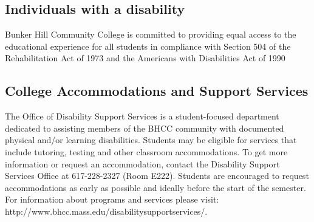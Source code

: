 \documentclass[12pt,letterpaper]{article}
\begin{document}
\subsection*{Individuals with a disability}
Bunker Hill Community College is committed to providing equal access to the educational experience for all students in compliance with Section 504 of the Rehabilitation Act of 1973 and the Americans with Disabilities Act of 1990

\subsection*{College Accommodations and Support Services }
The Office of Disability Support Services is a student-focused department dedicated to assisting members of the BHCC community with documented physical and/or learning disabilities. Students may be eligible for services that include tutoring, testing and other classroom accommodations. To get more information or request an accommodation, contact the Disability Support Services Office at 617-228-2327 (Room E222). Students are encouraged to request accommodations as early as possible and ideally before the start of the semester. For information about programs and services please visit: http://www.bhcc.mass.edu/disabilitysupportservices/.  
\end{document}
